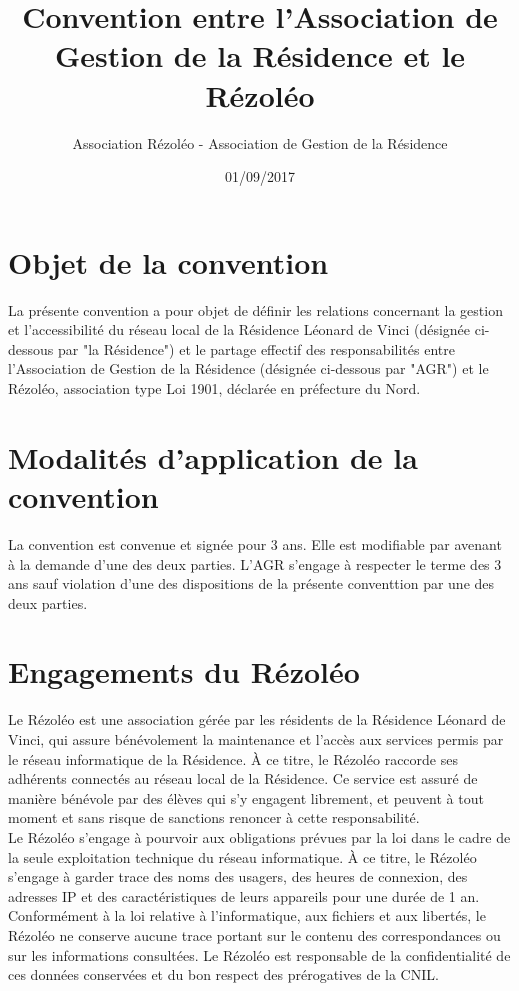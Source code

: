 \documentclass[12pt]{constitution}
\begin{document}
\title{Convention entre l'Association de Gestion de la Résidence et le Rézoléo}
\author{Association Rézoléo - Association de Gestion de la Résidence}
\date{01/09/2017}
\maketitle

\section{Objet de la convention}

    La présente convention a pour objet de définir les relations concernant la gestion et l'accessibilité du réseau local de la Résidence Léonard de Vinci (désignée ci-dessous par "la Résidence") et le partage effectif des responsabilités entre l'Association de Gestion de la Résidence (désignée ci-dessous par "AGR") et le Rézoléo, association type Loi 1901, déclarée en préfecture du Nord.


\section{Modalités d'application de la convention}

    La convention est convenue et signée pour 3 ans. Elle est modifiable par avenant à la demande d'une des deux parties. L'AGR s'engage à respecter le terme des 3 ans sauf violation d'une des dispositions de la présente conventtion par une des deux parties.


\section{Engagements du Rézoléo}

    Le Rézoléo est une association gérée par les résidents de la Résidence Léonard de Vinci, qui assure bénévolement la maintenance et l'accès aux services permis par le réseau informatique de la Résidence. À ce titre, le Rézoléo raccorde ses adhérents connectés au réseau local de la Résidence. Ce service est assuré de manière bénévole par des élèves qui s'y engagent librement, et peuvent à tout moment et sans risque de sanctions renoncer à cette responsabilité.\\


    Le Rézoléo s'engage à pourvoir aux obligations prévues par la loi dans le cadre de la seule exploitation technique du réseau informatique. À ce titre, le Rézoléo s'engage à garder trace des noms des usagers, des heures de connexion, des adresses IP et des caractéristiques de leurs appareils pour une durée de 1 an. Conformément à la loi relative à l'informatique, aux fichiers et aux libertés, le Rézoléo ne conserve aucune trace portant sur le contenu des correspondances ou sur les informations consultées. Le Rézoléo est responsable de la confidentialité de ces données conservées et du bon respect des prérogatives de la CNIL.\\
\end{document}
